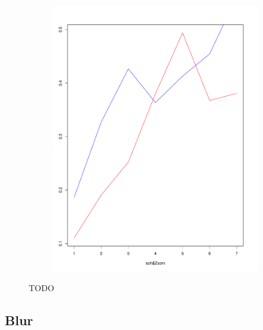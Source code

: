 \documentclass{itatnew}
\begin{document}
\begin{figure}[htp]
\begin{subfigure}{\linewidth}
    \includegraphics[width=\linewidth]{images/SoHZoomDown}
    \label{fig:DownwardZoom}
  \end{subfigure}
  \caption{TODO}
  \label{fig:Zoom}
\end{figure}


\subsection{Blur}
\end{document}
